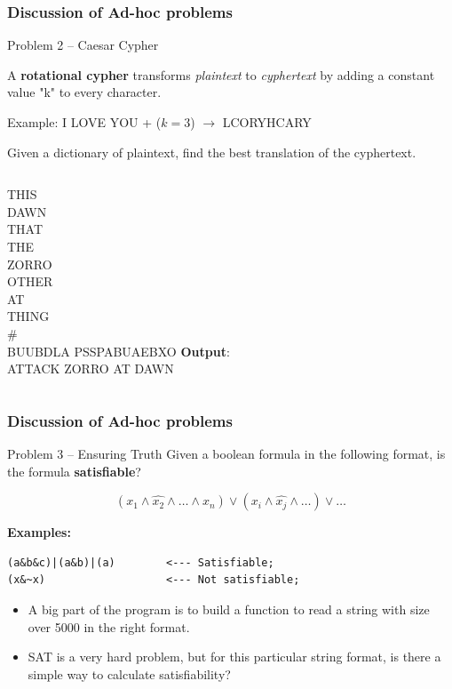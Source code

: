 \documentclass{beamer}
\begin{document}
\begin{frame}
  \frametitle{Discussion of Ad-hoc problems}
    \begin{exampleblock}{Problem 2 -- Caesar Cypher}
      {\small A {\bf rotational cypher} transforms \emph{plaintext} to
      \emph{cyphertext} by adding a constant value "k" to every character.\medskip

      Example: I LOVE YOU + ($k = 3$) $\rightarrow$ LCORYHCARY\medskip

      Given a dictionary of plaintext, find the best translation of
      the cyphertext.}
    \end{exampleblock}

    \begin{columns}
      {\small
      THIS\\
      DAWN\\
      THAT\\
      THE\\
      ZORRO\\
      OTHER\\
      AT\\
      THING\\
      \#\\
      BUUBDLA PSSPABUAEBXO}
      {\bf Output}:\\ ATTACK ZORRO AT DAWN
    \end{columns}
\end{frame}


\begin{frame}[fragile]
  \frametitle{Discussion of Ad-hoc problems}

    \begin{exampleblock}{Problem 3 -- Ensuring Truth}
      Given a boolean formula in the following format, is the formula
      {\bf satisfiable}?

      \begin{equation*}
        (x_1\land \hat{x_2}\land \ldots \land {x_n}) \lor (x_i\land \hat{x_j}\land\ldots) \lor \ldots
      \end{equation*}

      {\bf Examples:}
\begin{verbatim}
(a&b&c)|(a&b)|(a)        <--- Satisfiable;
(x&~x)                   <--- Not satisfiable;
\end{verbatim}
    \end{exampleblock}

    \begin{itemize}
      \item A big part of the program is to build a function to read a string with size over 5000 in the right format.
      \item SAT is a very hard problem, but for this particular string format, is there a simple way to calculate satisfiability?
    \end{itemize}
\end{frame}
\end{document}
